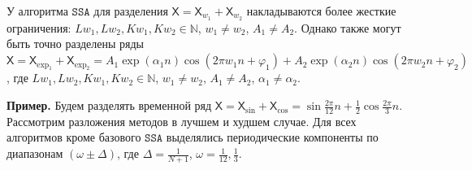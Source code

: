 \documentclass[12pt, specialist, subf
]{disser}
\theoremstyle{definition}
\newcommand{\SSA}{\texttt{SSA}}
\newcommand{\TS}{\mathsf{X}}
\begin{document}
У алгоритма $\SSA$ для разделения $\TS = \TS_{w_1} + \TS_{w_2}$ накладываются более жесткие ограничения:  $Lw_1, Lw_2, Kw_1, Kw_2 \in \mathbb{N}$, $w_1 \not = w_2$, $A_1 \not = A_2$. Однако также могут быть точно разделены ряды $\TS = \TS_{\exp_1} + \TS_{\exp_2} = A_1 \exp(\alpha_1 n)\cos(2\pi w_1 n + \varphi_1) + A_2 \exp(\alpha_2 n)\cos(2\pi w_2 n + \varphi_2)$, где $Lw_1, Lw_2, Kw_1, Kw_2 \in \mathbb{N}$, $w_1 \not = w_2$, $A_1 \not = A_2$, $\alpha_1 \not = \alpha_2$.

\textbf{\large{Пример.}} Будем разделять временной ряд $\TS = \TS_{\sin} + \TS_{\cos} = \sin{\frac{2\pi}{12}n} + \frac{1}{2}\cos{\frac{2\pi}{3}n}$. Рассмотрим разложения методов в лучшем и худшем случае. Для всех алгоритмов кроме базового $\SSA$ выделялись периодические компоненты по диапазонам $\left(\omega \pm \Delta \right)$, где $\Delta = \frac{1}{N+1}$, $\omega = \frac{1}{12}, \frac{1}{3}$.
\end{document}
